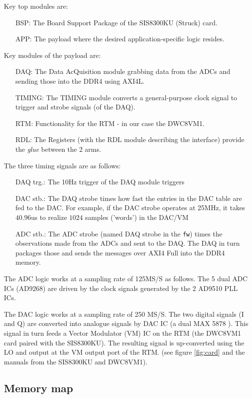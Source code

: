 \documentclass[12pt]{amsart}
\begin{document}
Key top modules are:
\begin{itemize}
\item[BSP:] The Board Support Package of the SIS8300KU (Struck) card.
\item[APP:] The payload where the desired application-specific logic resides.
\end{itemize}
Key modules of the payload are:
\begin{itemize}
\item[DAQ:] The Data AcQuisition module grabbing data from the ADCs and sending those into the DDR4 using AXI4L.
\item[TIMING:] The TIMING module converts a general-purpose clock signal to trigger and strobe signals (of the DAQ).
\item[RTM:] Functionality for the RTM - in our case the DWC8VM1.
\item[RDL:] The Registers (with the RDL module describing the interface) provide the {\em glue} between the 2 arms. 
\end{itemize}
The three timing signals are as follows:
\begin{itemize}
\item[DAQ trg.:] The 10Hz trigger of the DAQ module triggers  
\item[DAC stb.:] The DAQ strobe times how fast the entries in the DAC table are fed to the DAC.
	For example, if the DAC strobe operates at 25MHz, it takes $40.96$us to realize $1024$ samples ('words') in the DAC/VM
\item[ADC stb.:] The ADC strobe (named DAQ strobe in the \verb|fw|) times the observations made from the ADCs
	and sent to the DAQ. The DAQ in turn packages those and sends the messages over AXI4 Full into the DDR4 memory.
\end{itemize}


The ADC logic works at a sampling rate of 125MS/S as follows. 
The 5 dual ADC ICs (AD9268) are driven by the clock signals generated by the 2 AD9510 PLL ICs.
 
The DAC logic works at a sampling rate of 250 MS/S.
The two digital signals (I and Q) are converted into analogue signals by DAC IC (a dual MAX 5878 ).
This signal in turn feeds a Vector Modulator (VM) IC on the RTM (the DWC8VM1 card paired with the SIS8300KU).
The resulting signal is up-converted using the LO and output at the VM output port of the RTM.
(see figure \ref{fig:card} and the manuals from the SIS8300KU and DWC8VM1).


\subsection{Memory map}
\end{document}
